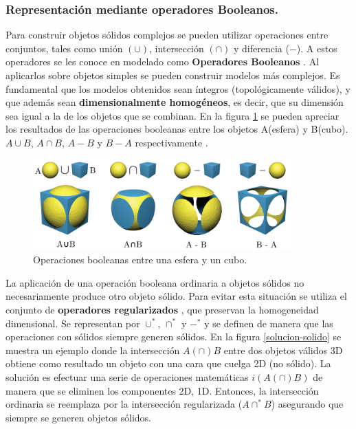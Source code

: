 \subsubsection{Representación mediante operadores Booleanos. }

Para construir objetos sólidos complejos se pueden utilizar operaciones entre conjuntos, tales como unión $(\cup)$, intersección $(\cap)$ y diferencia ($-$). A estos operadores se les conoce en modelado como \textbf{Operadores Booleanos} \citep{Ramos2011}. Al aplicarlos sobre objetos simples se pueden construir modelos más complejos. Es fundamental que los modelos obtenidos sean íntegros (topológicamente válidos), y que además sean \textbf{dimensionalmente homogéneos}, es decir, que su dimensión sea igual a la de los objetos que se combinan. En la figura \ref{fig:booleano1} se pueden apreciar los resultados de las operaciones booleanas entre los objetos A(esfera) y  B(cubo). $A \cup B$,  $A \cap B$, $A - B$  y  $B - A$  respectivamente \citep{Zhou2018}.

\begin{figure}[ht]
\includegraphics[width=10cm]{Img/GEO/boolean55.png}
\centering
\caption{\footnotesize{Operaciones booleanas entre una esfera y un cubo.}}
\label{fig:booleano1}
\end{figure}

\vspace{5mm}

La aplicación de una operación booleana ordinaria a objetos sólidos no necesariamente produce otro objeto sólido. 
Para evitar esta situación se utiliza el conjunto de \textbf{operadores regularizados} \citep{Ramos2011}, que preservan la homogeneidad dimensional. Se representan por $\cup^*$, $\cap^*$ y $-^*$ y se definen de manera que las operaciones con sólidos siempre generen sólidos.
En la figura \ref{solucion-solido} se muestra un ejemplo donde la intersección $A (\cap) B$ entre dos objetos válidos 3D obtiene como resultado un objeto con una cara que cuelga 2D (no sólido). La solución es efectuar una serie de operaciones matemáticas $i(A (\cap) B)$ de manera que se eliminen los componentes 2D, 1D. Entonces, la intersección ordinaria se reemplaza por la intersección regularizada ($ A \cap^* B$) \citep{Torres2014} asegurando que siempre se generen objetos sólidos.
 

